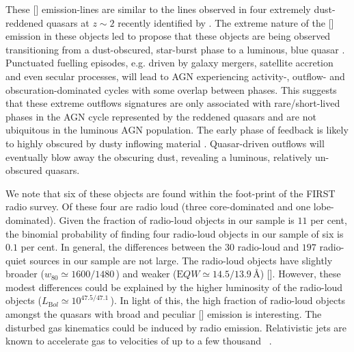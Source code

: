 These [] emission-lines are similar to the lines observed in four extremely dust-reddened quasars at $z\sim2$ recently identified by \citet{zakamska16}. 
The extreme nature of the [] emission in these objects led \citet{zakamska16} to propose that these objects are being observed transitioning from a dust-obscured, star-burst phase to a luminous, blue quasar \citep[e.g.][]{sanders88}.
Punctuated fuelling episodes, e.g. driven by galaxy mergers, satellite accretion and even secular processes,
will lead to AGN experiencing activity-, outflow- and obscuration-dominated cycles with some overlap between phases. 
This suggests that these extreme outflows signatures are only associated with rare/short-lived phases in the AGN cycle represented by the reddened quasars and are not ubiquitous in the luminous AGN population.
The early phase of feedback is likely to highly obscured by dusty inflowing material \citep[e.g.][]{haas03}.
Quasar-driven outflows will eventually blow away the obscuring dust, revealing a luminous, relatively un-obscured quasars.  

We note that six of these objects are found within the foot-print of the FIRST radio survey. 
Of these four are radio loud (three core-dominated and one lobe-dominated). 
Given the fraction of radio-loud objects in our sample is $11$ per cent, the binomial probability of finding four radio-loud objects in our sample of six is $0.1$ per cent. 
In general, the differences between the $30$ radio-loud and $197$ radio-quiet sources in our sample are not large. 
The radio-loud objects have slightly broader ($w_{80}\simeq1600/1480$\,\kms) and weaker (${\mathrm EQW}\simeq14.5/13.9$\,\AA) []. 
However, these modest differences could be explained by the higher luminosity of the radio-loud objects ($L_{\mathrm Bol}\simeq10^{47.5/47.1}$\,\ergs).
In light of this, the high fraction of radio-loud objects amongst the quasars with broad and peculiar [] emission is interesting. 
The disturbed gas kinematics could be induced by radio emission. 
Relativistic jets are known to accelerate gas to velocities of up to a few thousand \kms\, \citep[e.g.][]{nesvadba06,nesvadba08}.


